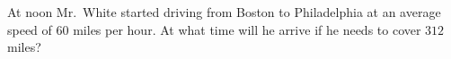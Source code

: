 At noon Mr.\ White started driving from Boston to Philadelphia at an average speed of $60$ miles per hour. At what time will he arrive if he needs to cover $312$ miles?
